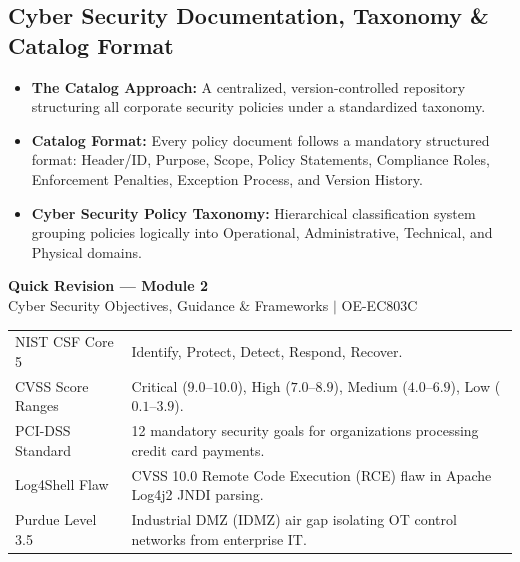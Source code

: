 \documentclass[12pt,a4paper]{article}
\renewcommand{\arraystretch}{1.45}
\begin{document}
\subsection{Cyber Security Documentation, Taxonomy \& Catalog Format}
\begin{itemize}[leftmargin=*, itemsep=3pt]
  \item \textbf{The Catalog Approach:} A centralized, version-controlled repository structuring all corporate security policies under a standardized taxonomy.
  \item \textbf{Catalog Format:} Every policy document follows a mandatory structured format: Header/ID, Purpose, Scope, Policy Statements, Compliance Roles, Enforcement Penalties, Exception Process, and Version History.
  \item \textbf{Cyber Security Policy Taxonomy:} Hierarchical classification system grouping policies logically into Operational, Administrative, Technical, and Physical domains.
\end{itemize}

\newpage
\begin{center}
  {\large\bfseries\color{myred} Quick Revision --- Module 2}\\[3pt]
  {\small\color{mydark} Cyber Security Objectives, Guidance \& Frameworks $|$ OE-EC803C}
\end{center}
\noindent{\color{myred}\rule{\linewidth}{1.2pt}}
\vspace{4pt}

\begin{tcolorbox}[formulabox, title={\textbf{Key Concepts and Metrics at a Glance}}]
\renewcommand{\arraystretch}{1.35}
\begin{tabularx}{\linewidth}{B{4.8cm} X}
NIST CSF Core 5 & Identify, Protect, Detect, Respond, Recover. \\[3pt]
CVSS Score Ranges & Critical ($9.0\text{--}10.0$), High ($7.0\text{--}8.9$), Medium ($4.0\text{--}6.9$), Low ($0.1\text{--}3.9$). \\[3pt]
PCI-DSS Standard & 12 mandatory security goals for organizations processing credit card payments. \\[3pt]
Log4Shell Flaw & CVSS 10.0 Remote Code Execution (RCE) flaw in Apache Log4j2 JNDI parsing. \\[3pt]
Purdue Level 3.5 & Industrial DMZ (IDMZ) air gap isolating OT control networks from enterprise IT.
\end{tabularx}
\end{tcolorbox}
\end{document}
